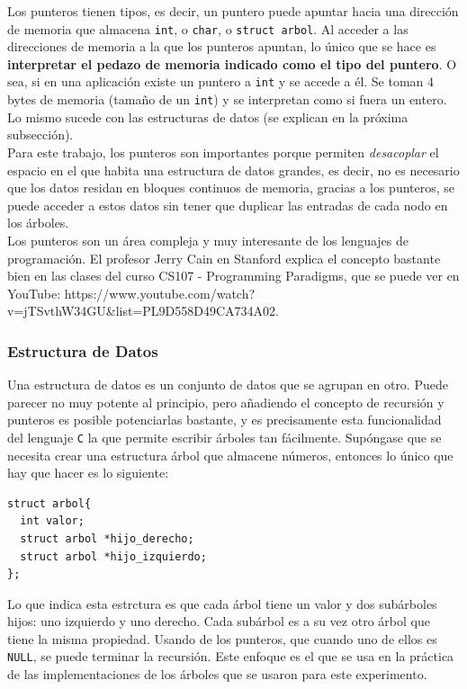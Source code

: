 \documentclass[12pt,letterpaper]{report}
\begin{document}
Los punteros tienen tipos, es decir, un puntero puede apuntar hacia una dirección de memoria que almacena \texttt{int}, o \texttt{char}, o \texttt{struct arbol}. Al acceder a las direcciones de memoria a la que los punteros apuntan, lo único que se hace es \textbf{interpretar el pedazo de memoria indicado como el tipo del puntero}. O sea, si en una aplicación existe un puntero a \texttt{int} y se accede a él. Se toman 4 bytes de memoria (tamaño de un \texttt{int}) y se interpretan como si fuera un entero. Lo mismo sucede con las estructuras de datos (se explican en la próxima subsección).\\

Para este trabajo, los punteros son importantes porque permiten \emph{desacoplar} el espacio en el que habita una estructura de datos grandes, es decir, no es necesario que los datos residan en bloques continuos de memoria, gracias a los punteros, se puede acceder a estos datos sin tener que duplicar las entradas de cada nodo en los árboles.\\

Los punteros son un área compleja y muy interesante de los lenguajes de programación. El profesor Jerry Cain en Stanford explica el concepto bastante bien en las clases del curso CS107 - Programming Paradigms, que se puede ver en YouTube: https://www.youtube.com/watch?v=jTSvthW34GU&list=PL9D558D49CA734A02.

\subsubsection{Estructura de Datos}
Una estructura de datos es un conjunto de datos que se agrupan en otro. Puede parecer no muy potente al principio, pero añadiendo el concepto de recursión y punteros es posible potenciarlas bastante, y es precisamente esta funcionalidad del lenguaje \texttt{C} la que permite escribir árboles tan fácilmente. Supóngase que se necesita crear una estructura árbol que almacene números, entonces lo único que hay que hacer es lo siguiente:
\begin{verbatim}
struct arbol{
  int valor;
  struct arbol *hijo_derecho;
  struct arbol *hijo_izquierdo;
};
\end{verbatim}
Lo que indica esta estrctura es que cada árbol tiene un valor y dos subárboles hijos: uno izquierdo y uno derecho. Cada subárbol es a su vez otro árbol que tiene la misma propiedad. Usando de los punteros, que cuando uno de ellos es \texttt{NULL}, se puede terminar la recursión. Este enfoque es el que se usa en la práctica de las implementaciones de los árboles que se usaron para este experimento.\\
\end{document}
